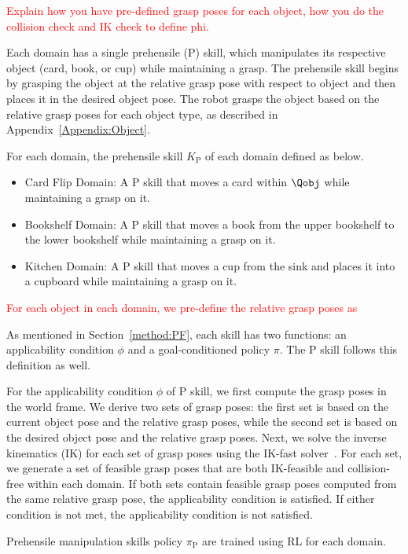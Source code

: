 \textcolor{red}{Explain how you have pre-defined grasp poses for each object, how you do the collision check and IK check to define phi. 
}

Each domain has a single prehensile (P) skill, which manipulates its respective object (card, book, or cup) while maintaining a grasp. The prehensile skill begins by grasping the object at the relative grasp pose with respect to object and then places it in the desired object pose. The robot grasps the object based on the relative grasp poses for each object type, as described in Appendix~\ref{Appendix:Object}.

For each domain, the prehensile skill $K_\text{P}$ of each domain defined as below.
\begin{itemize}
    \item Card Flip Domain: A P skill that moves a card within \( \Qobj \) while maintaining a grasp on it. 
    \item Bookshelf Domain: A P skill that moves a book from the upper bookshelf to the lower bookshelf while maintaining a grasp on it. 
    \item Kitchen Domain: A P skill that moves a cup from the sink and places it into a cupboard while maintaining a grasp on it.
\end{itemize}

\textcolor{red}{For each object in each domain, we pre-define the relative grasp poses as }

As mentioned in Section~\ref{method:PF}, each skill has two functions: an applicability condition \( \phi \) and a goal-conditioned policy \( \pi \). The P skill follows this definition as well.

For the applicability condition $\phi$ of P skill, we first compute the grasp poses in the world frame. We derive two sets of grasp poses: the first set is based on the current object pose and the relative grasp poses, while the second set is based on the desired object pose and the relative grasp poses. Next, we solve the inverse kinematics (IK) for each set of grasp poses using the IK-fast solver~\cite{diankov_thesis}. For each set, we generate a set of feasible grasp poses that are both IK-feasible and collision-free within each domain. If both sets contain feasible grasp poses computed from the same relative grasp pose, the applicability condition is satisfied. If either condition is not met, the applicability condition is not satisfied.

Prehensile manipulation skills policy $\pi_\text{P}$ are trained using RL for each domain.  